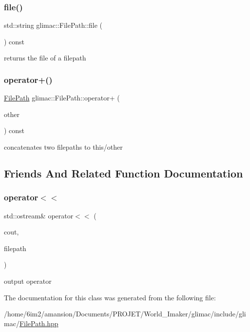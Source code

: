 \subsubsection{\texorpdfstring{file()}{file()}}
{\footnotesize\ttfamily std\+::string glimac\+::\+File\+Path\+::file (\begin{DoxyParamCaption}{ }\end{DoxyParamCaption}) const\hspace{0.3cm}{\ttfamily [inline]}}

returns the file of a filepath \mbox{\label{classglimac_1_1FilePath_a8113825c73d8a8f1f1cf3ca57de6bad8}} 
\subsubsection{\texorpdfstring{operator+()}{operator+()}}
{\footnotesize\ttfamily \hyperlink{classglimac_1_1FilePath}{File\+Path} glimac\+::\+File\+Path\+::operator+ (\begin{DoxyParamCaption}\item[{const \hyperlink{classglimac_1_1FilePath}{File\+Path} \&}]{other }\end{DoxyParamCaption}) const\hspace{0.3cm}{\ttfamily [inline]}}

concatenates two filepaths to this/other 

\subsection{Friends And Related Function Documentation}
\mbox{\label{classglimac_1_1FilePath_a924c4e68c4618cf40156646d23ec5f1c}} 
\subsubsection{\texorpdfstring{operator$<$$<$}{operator<<}}
{\footnotesize\ttfamily std\+::ostream\& operator$<$$<$ (\begin{DoxyParamCaption}\item[{std\+::ostream \&}]{cout,  }\item[{const \hyperlink{classglimac_1_1FilePath}{File\+Path} \&}]{filepath }\end{DoxyParamCaption})\hspace{0.3cm}{\ttfamily [friend]}}

output operator 

The documentation for this class was generated from the following file\+:\begin{DoxyCompactItemize}
\item 
/home/6im2/amansion/\+Documents/\+P\+R\+O\+J\+E\+T/\+World\+\_\+\+Imaker/glimac/include/glimac/\hyperlink{FilePath_8hpp}{File\+Path.\+hpp}\end{DoxyCompactItemize}
